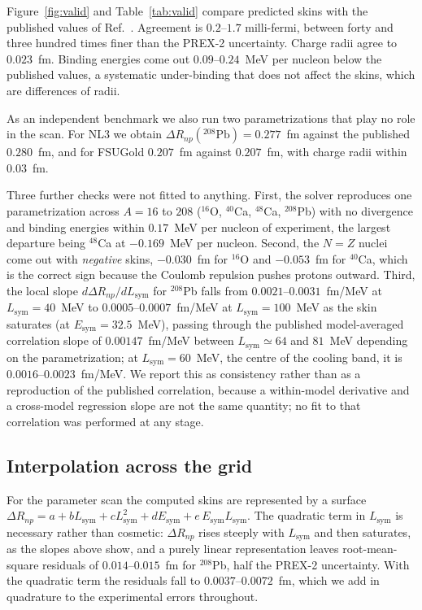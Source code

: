 \documentclass[aps,prc,twocolumn,showpacs,superscriptaddress,floatfix]{revtex4-2}
\newcommand{\Esym}{E_{\mathrm{sym}}}
\newcommand{\Lsym}{L_{\mathrm{sym}}}
\newcommand{\DRnp}{\Delta R_{np}}
\begin{document}
Figure~\ref{fig:valid} and Table~\ref{tab:valid} compare predicted skins with
the published values of Ref.~\cite{Das2021}. Agreement
is $0.2$--$1.7$ milli-fermi, between forty and three hundred times finer than
the PREX-2 uncertainty. Charge radii agree to $0.023$~fm. Binding energies come
out $0.09$--$0.24$~MeV per nucleon below the published values, a systematic
under-binding that does not affect the skins, which are differences of radii.

As an independent benchmark we also run two parametrizations that play no
role in the scan. For NL3 \citep{NL3} we obtain $\DRnp(^{208}\mathrm{Pb})=0.277$~fm
against the published $0.280$~fm, and for FSUGold \citep{ToddRutel2005}
$0.207$~fm against $0.207$~fm, with charge radii within $0.03$~fm.

Three further checks were not fitted to anything. First, the solver reproduces
one parametrization across $A=16$ to $208$ ($^{16}$O, $^{40}$Ca, $^{48}$Ca,
$^{208}$Pb) with no divergence and binding energies within
$0.17$~MeV per nucleon of experiment, the largest departure being $^{48}$Ca at
$-0.169$~MeV per nucleon. Second, the
$N=Z$ nuclei come out with \emph{negative} skins, $-0.030$~fm for $^{16}$O and
$-0.053$~fm for $^{40}$Ca, which is the correct sign because the Coulomb
repulsion pushes protons outward. Third, the local slope
$d\DRnp/d\Lsym$ for $^{208}$Pb falls from
$0.0021$--$0.0031$~fm/MeV at $\Lsym = 40$~MeV to
$0.0005$--$0.0007$~fm/MeV at $\Lsym = 100$~MeV as the skin saturates (at
$\Esym=32.5$~MeV), passing through the published model-averaged correlation
slope of $0.00147$~fm/MeV \cite{RocaMaza2011} between $\Lsym \simeq 64$ and
$81$~MeV depending on the parametrization; at $\Lsym = 60$~MeV, the centre of
the cooling band, it is $0.0016$--$0.0023$~fm/MeV. We
report this as consistency rather than as a reproduction of the published
correlation, because a within-model derivative and a cross-model regression
slope are not the same quantity; no fit to that correlation was performed at any
stage.

\subsection{Interpolation across the grid}

For the parameter scan the computed skins are represented by a surface
$\DRnp = a + b\Lsym + c\Lsym^2 + d\Esym + e\,\Esym\Lsym$. The quadratic term in
$\Lsym$ is necessary rather than cosmetic: $\DRnp$ rises steeply with $\Lsym$
and then saturates, as the slopes above show, and a purely linear representation
leaves root-mean-square residuals of $0.014$--$0.015$~fm for $^{208}$Pb,
half the PREX-2 uncertainty. With the quadratic term the residuals fall to
$0.0037$--$0.0072$~fm, which we add in quadrature to the
experimental errors throughout.
\end{document}

